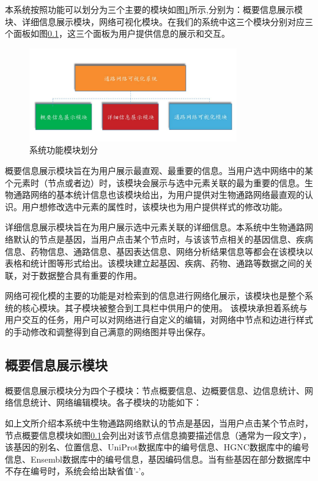 本系统按照功能可以划分为三个主要的模块如图\ref{fig32}所示,分别为：概要信息展示模块、详细信息展示模块，网络可视化模块。在我们的系统中这三个模块分别对应三个面板如图\ref{}，这三个面板为用户提供信息的展示和交互。

\begin{figure}[h]
\centering
\includegraphics[width = 0.8\textwidth]{module}
\caption[fig32]{系统功能模块划分}
\label{fig32}
\end{figure}

概要信息展示模块旨在为用户展示最直观、最重要的信息。当用户选中网络中的某个元素时（节点或者边）时，该模块会展示与选中元素关联的最为重要的信息。生物通路网络的基本统计信息也该模块给出，为用户提供对生物通路网络最直观的认识。用户想修改选中元素的属性时，该模块也为用户提供样式的修改功能。

详细信息展示模块旨在为用户展示选中元素关联的详细信息。本系统中生物通路网络默认的节点是基因，当用户点击某个节点时，与该该节点相关的基因信息、疾病信息、药物信息、通路信息、基因表达信息、网络分析结果信息等都会在该模块以表格和统计图等形式给出。该模块建立起基因、疾病、药物、通路等数据之间的关联，对于数据整合具有重要的作用。

网络可视化模的主要的功能是对检索到的信息进行网络化展示，该模块也是整个系统的核心模块。其子模块被整合到工具栏中供用户的使用。 该模块承担着系统与用户交互的任务，用户可以对网络进行自定义的编辑，对网络中节点和边进行样式的手动修改和调整得到自己满意的网络图并导出保存。

\subsection{概要信息展示模块}
概要信息展示模块分为四个子模块：节点概要信息、边概要信息、边信息统计、网络信息统计、网络编辑模块。各子模块的功能如下：

如上文所介绍本系统中生物通路网络默认的节点是基因，当用户点击某个节点时，节点概要信息模块如图\ref{}会列出对该节点信息摘要描述信息（通常为一段文字），该基因的别名、位置信息、UniProt\cite{}数据库中的编号信息、HGNC\cite{}数据库中的编号信息、Ensembl\cite{}数据库中的编号信息，基因编码信息。当有些基因在部分数据库中不存在编号时，系统会给出缺省值'-'。


